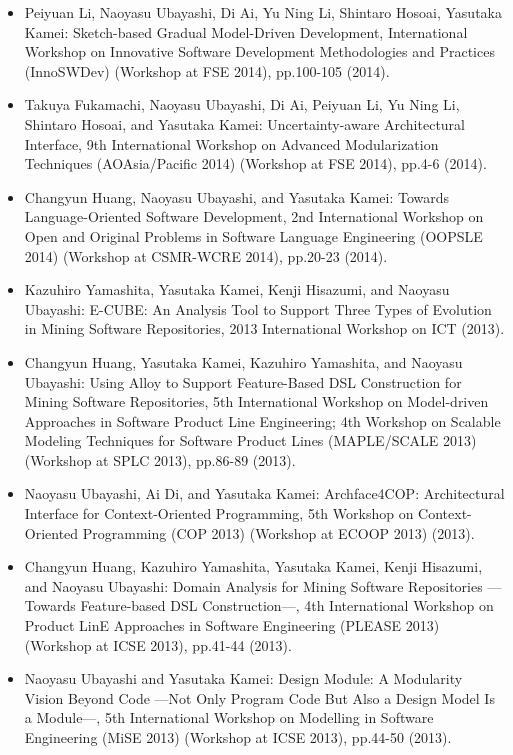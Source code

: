 \documentclass{article}
\begin{document}
\begin{itemize}
\item Peiyuan Li, Naoyasu Ubayashi, Di Ai, Yu Ning Li, Shintaro Hosoai, Yasutaka Kamei:
Sketch-based Gradual Model-Driven Development,
International Workshop on Innovative Software Development Methodologies and Practices (InnoSWDev) (Workshop at FSE 2014), pp.100-105 (2014).

\item Takuya Fukamachi, Naoyasu Ubayashi, Di Ai, Peiyuan Li, Yu Ning Li, Shintaro Hosoai, and Yasutaka Kamei:
Uncertainty-aware Architectural Interface,
9th International Workshop on Advanced Modularization Techniques (AOAsia/Pacific 2014)  (Workshop at FSE 2014), pp.4-6 (2014).

\item Changyun Huang, Naoyasu Ubayashi, and Yasutaka Kamei:
Towards Language-Oriented Software Development,
2nd International Workshop on Open and Original Problems in Software Language Engineering (OOPSLE 2014) (Workshop at CSMR-WCRE 2014), pp.20-23 (2014).

\item Kazuhiro Yamashita, Yasutaka Kamei, Kenji Hisazumi, and Naoyasu Ubayashi:
E-CUBE: An Analysis Tool to Support Three Types of Evolution in Mining Software Repositories,
2013 International Workshop on ICT (2013).

\item Changyun Huang, Yasutaka Kamei, Kazuhiro Yamashita, and Naoyasu Ubayashi:
Using Alloy to Support Feature-Based DSL Construction for Mining Software Repositories,
5th International Workshop on Model-driven Approaches in Software Product Line Engineering; 4th Workshop on Scalable Modeling Techniques for Software Product Lines (MAPLE/SCALE 2013)  (Workshop at SPLC 2013), pp.86-89 (2013).

\item Naoyasu Ubayashi, Ai Di, and Yasutaka Kamei:
Archface4COP: Architectural Interface for Context-Oriented Programming,
5th Workshop on Context-Oriented Programming (COP 2013) (Workshop at ECOOP 2013) (2013).

\item Changyun Huang, Kazuhiro Yamashita, Yasutaka Kamei, Kenji Hisazumi, and Naoyasu Ubayashi:
Domain Analysis for Mining Software Repositories ---Towards Feature-based DSL Construction---,
4th International Workshop on Product LinE Approaches in Software Engineering (PLEASE 2013) (Workshop at ICSE 2013), pp.41-44 (2013).

\item Naoyasu Ubayashi and Yasutaka Kamei:
Design Module: A Modularity Vision Beyond Code ---Not Only Program Code But Also a Design Model Is a Module---,
5th International Workshop on Modelling in Software Engineering (MiSE 2013) (Workshop at ICSE 2013), pp.44-50 (2013).


\end{itemize}
\end{document}
